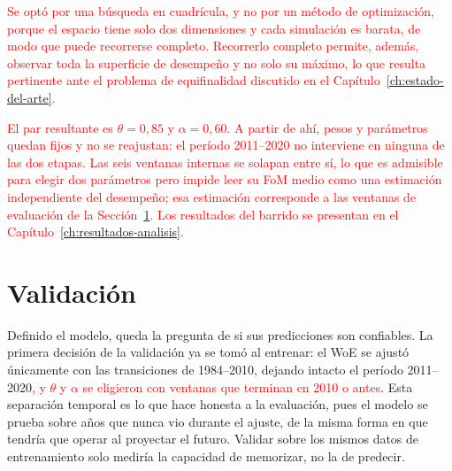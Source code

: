 \textcolor{red}{Se optó por una búsqueda en cuadrícula, y no por un método de
optimización, porque el espacio tiene solo dos dimensiones y cada simulación es
barata, de modo que puede recorrerse completo. Recorrerlo completo permite,
además, observar toda la superficie de desempeño y no solo su máximo, lo que
resulta pertinente ante el problema de equifinalidad discutido en el
Capítulo~\ref{ch:estado-del-arte}.}

\textcolor{red}{El par resultante es $\theta = 0{,}85$ y $\alpha = 0{,}60$. A
partir de ahí, pesos y parámetros quedan fijos y no se reajustan: el período
2011--2020 no interviene en ninguna de las dos etapas. Las seis ventanas
internas se solapan entre sí, lo que es admisible para elegir dos parámetros
pero impide leer su FoM medio como una estimación independiente del desempeño;
esa estimación corresponde a las ventanas de evaluación de la
Sección~\ref{sec:validacion-protocolo}. Los resultados del barrido se presentan
en el Capítulo~\ref{ch:resultados-analisis}.}


\section{Validación}
\label{sec:validacion-protocolo}

Definido el modelo, queda la pregunta de si sus predicciones son confiables. La primera decisión de la validación ya se tomó al entrenar: el WoE se ajustó únicamente con las transiciones de 1984--2010, dejando intacto el período 2011--2020\textcolor{red}{, y $\theta$ y $\alpha$ se eligieron con ventanas que terminan en 2010 o antes}. Esta separación temporal es lo que hace honesta a la evaluación, pues el modelo se prueba sobre años que nunca vio durante el ajuste, de la misma forma en que tendría que operar al proyectar el futuro. Validar sobre los mismos datos de entrenamiento solo mediría la capacidad de memorizar, no la de predecir.

